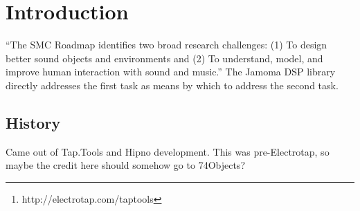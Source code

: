 \documentclass[twoside,10pt]{article}
\affiliation{}{}
\title{\papertitle}
\begin{document}
    
\maketitle


\begin{abstract}

This paper presents an object-oriented, reflective, light-weight application programming interface for C++, with an emphasis on real-time signal processing. It makes use of polymorphic typing, dynamic binding, and introspection to create a cross-platform environment pulling ideas from languages such as Smalltalk and Objective-C while remaining within the bounds of the portable and cross-platform C++ context.  The Jamoma Foundation and DSP Library provide a flexible framework and runtime environment, as well as an expanding collection of unit generators for synthesis, processing, and analysis.  This library has been used in both open source and commercial software projects over the past seven years including Electrotap's Tap.Tools\footnote{http://electrotap.com/taptools}, Cycling '74's Hipno\cite{Place:2005}, and the Jamoma Modular Framework\cite{Place:2006}.

\end{abstract}



\section{Introduction} %
\label{sec:introduction}

``The SMC Roadmap identifies two broad research challenges: (1) To design better sound objects and environments and (2) To understand, model, and improve human interaction with sound and music.'' \cite{serra:2007}  The Jamoma DSP library directly addresses the first task as means by which to address the second task.

\subsection{History}

Came out of Tap.Tools and Hipno development.  This was pre-Electrotap, so maybe the credit here should somehow go to 74Objects?
\end{document}
